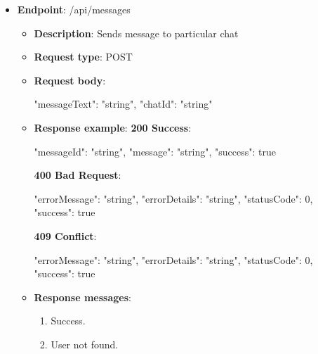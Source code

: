 \begin{itemize}
    \item \textbf{Endpoint}: /api/messages
    \begin{itemize}
        \item \textbf{Description}: Sends message to particular chat
        \item \textbf{Request type}: POST
        \item \textbf{Request body}:
        \begin{spverbatim}
        {
            "messageText": "string",
            "chatId": "string"
        }
        \end{spverbatim}
        \item \textbf{Response example}:
        \textbf{200 Success}:
        \begin{spverbatim}
        {
            "messageId": "string",
            "message": "string",
            "success": true
        }
        \end{spverbatim}
        \textbf{400 Bad Request}:
        \begin{spverbatim}
        {
            "errorMessage": "string",
            "errorDetails": "string",
            "statusCode": 0,
            "success": true
        }
        \end{spverbatim}
        \textbf{409 Conflict}:
        \begin{spverbatim}
        {
            "errorMessage": "string",
            "errorDetails": "string",
            "statusCode": 0,
            "success": true
        }
        \end{spverbatim}
        \item \textbf{Response messages}:
        \begin{enumerate}
            \item Success.
            \item User not found.
        \end{enumerate}
    \end{itemize}


\end{itemize}
